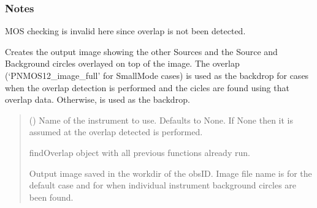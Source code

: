\documentclass[letterpaper,10pt,english]{sphinxmanual}
\begin{document}
\begin{fulllineitems}
\begin{fulllineitems}
\subsubsection*{Notes}

\sphinxAtStartPar
{} MOS checking is invalid here since overlap is not been detected.

\end{fulllineitems}


\begin{fulllineitems}
\label{\detokenize{xmmPipeline:xmmPipeline.findOverlap.findOverlap.createOutputImages}}
\pysigstartsignatures
{}
\pysigstopsignatures
\sphinxAtStartPar
Creates the  output image showing
the other Sources and the Source and Background circles overlayed
on top of the image.
The overlap (‘PNMOS12\_image\_full’ for Small\sphinxhyphen{}Mode cases) is used
as the backdrop for cases when the overlap detection is performed
and the cicles are found using that overlap data.
Otherwise,  is used as the backdrop.
\begin{quote}\begin{description}
\sphinxAtStartPar
{} () \textendash{} Name of the instrument to use. Defaults to None.
If None then it is assumed at the overlap detected is
performed.

\sphinxAtStartPar
findOverlap object with all previous functions already run.

\sphinxAtStartPar
Output image saved in the workdir of the obsID.
Image file name is  for the
default case and  for when individual
instrument background circles are been found.

\end{description}\end{quote}


\end{fulllineitems}
\end{fulllineitems}
\end{document}
